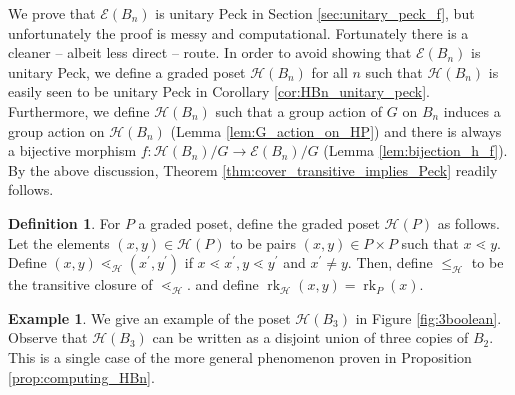 \documentclass[10 pt]{amsart}
\theoremstyle{plain}
\theoremstyle{definition}
\newtheorem{defn}[thm]{Definition}
\newtheorem{eg}[thm]{Example}
\theoremstyle{remark}
\numberwithin{equation}{section}
\newcommand\rk{\operatorname{rk}}
\begin{document}
We prove that $\mathcal E(B_n)$ is unitary Peck in Section \ref{sec:unitary_peck_f}, but unfortunately the proof is messy and computational.  Fortunately there is a cleaner -- albeit less direct -- route.  In order to avoid showing that $\mathcal E(B_n)$ is unitary Peck, we define a graded poset $\mathcal{H}(B_n)$ for all $n$ such that $\mathcal{H}(B_n)$ is easily seen to be unitary Peck in Corollary \ref{cor:HBn_unitary_peck}. Furthermore, we define $\mathcal{H}(B_n)$ such that a group action of $G$ on $B_n$ induces a group action on $\mathcal{H}(B_n)$ (Lemma \ref{lem:G_action_on_HP}) and there is always a bijective morphism $f\colon \mathcal{H}(B_n)/G\rightarrow \mathcal E(B_n)/G$ (Lemma \ref{lem:bijection_h_f}).  By the above discussion, Theorem \ref{thm:cover_transitive_implies_Peck} readily follows.

\begin{defn}
\label{defn:h_map}
For $P$ a graded poset, define the graded poset $\mathcal H(P)$ as follows. Let the elements $(x, y) \in \mathcal H(P)$ to be pairs $(x,y) \in P\times P$ such that $x \lessdot y$.  Define $(x, y) \lessdot_{\mathcal H} (x^\prime, y^\prime)$ if $x \lessdot x^\prime,y\lessdot y^\prime$ and $x^\prime \neq y.$ Then, define $\leq_{\mathcal H}$ to be the transitive closure of $\lessdot_{\mathcal H}.$ and define $\rk_{\mathcal H}(x, y) = \rk_P(x).$
\end{defn}


\begin{eg}
\label{eg:3boolean}
We give an example of the poset $\mathcal H(B_3)$ in Figure \ref{fig:3boolean}. Observe that $\mathcal H(B_3)$ can be written as a disjoint union of three copies of $B_2.$ This is a single case of the more general phenomenon proven in Proposition \ref{prop:computing_HBn}.
\end{eg}
\end{document}
